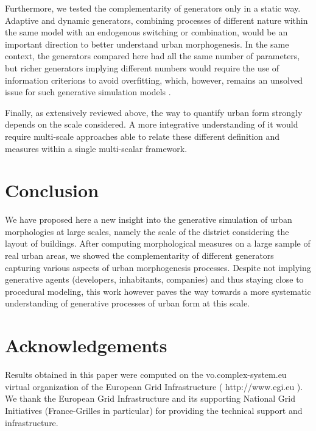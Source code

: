 \documentclass[letterpaper]{article}
\begin{document}
Furthermore, we tested the complementarity of generators only in a static way. Adaptive and dynamic generators, combining processes of different nature within the same model with an endogenous switching or combination, would be an important direction to better understand urban morphogenesis.
In the same context, the generators compared here had all the same number of parameters, but richer generators implying different numbers would require the use of information criterions to avoid overfitting, which, however, remains an unsolved issue for such generative simulation models \citep{piou2009proposing}.

Finally, as extensively reviewed above, the way to quantify urban form strongly depends on the scale considered. A more integrative understanding of it would require multi-scale approaches able to relate these different definition and measures within a single multi-scalar framework.


\section{Conclusion}

We have proposed here a new insight into the generative simulation of urban morphologies at large scales, namely the scale of the district considering the layout of buildings. After computing morphological measures on a large sample of real urban areas, we showed the complementarity of different generators capturing various aspects of urban morphogenesis processes. Despite not implying generative agents (developers, inhabitants, companies) and thus staying close to procedural modeling, this work however paves the way towards a more systematic understanding of generative processes of urban form at this scale.



\section{Acknowledgements}

Results obtained in this paper were computed on the vo.complex-system.eu virtual organization of the European Grid Infrastructure ( http://www.egi.eu ). We thank the European Grid Infrastructure and its supporting National Grid Initiatives (France-Grilles in particular) for providing the technical support and infrastructure. 

\footnotesize

\end{document}
